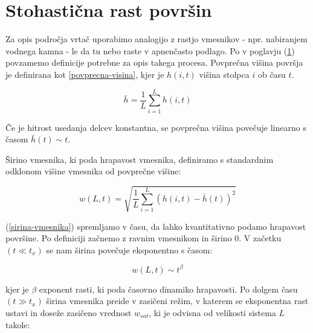 \documentclass[a4paper, oneside, 12pt]{book}
\begin{document}

        \section{Stohastična rast površin}
        \label{definicije}

        Za opis področja vrtač uporabimo analogijo z rastjo vmesnikov - npr. nabiranjem vodnega kamna - le da tu nebo raste v apnenčasto podlago.
        Po \cite{barabasi1995fractal} v poglavju (\ref{definicije}) povzamemo definicije potrebne za opis takega procesa.
        Povprečna višina površja je definirana kot \ref{povprecna-visina}, kjer je $h(i,t)$ višina stolpca $i$ ob času $t$.

        \begin{equation}
          \bar{h} = \frac{1}{L} \sum_{i=1}^L h(i,t)
          \label{povprecna-visina}
        \end{equation}

        Če je hitrost usedanja delcev konstantna, se povprečna višina povečuje linearno s časom $\bar{h}(t) \sim t$.

        Širino vmesnika, ki poda hrapavost vmesnika, definiramo s standardnim odklonom višine vmesnika od povprečne višine:

        \begin{equation}
          w(L,t) = \sqrt{\frac{1}{L} \sum_{i=1}^L (h(i,t)-\bar{h}(t))^2}
          \label{sirina-vmesnika}
        \end{equation}

        (\ref{sirina-vmesnika}) spremljamo v času, da lahko kvantitativno podamo hrapavost površine. Po definiciji začnemo z ravnim vmesnikom in širino 0. V začetku $(t \ll t_x)$ se nam širina povečuje eksponentno s časom:

        \begin{equation}
          w(L,t) \sim t^\beta
          \label{beta}
        \end{equation}

        kjer je $\beta$ exponent rasti, ki poda časovno dinamiko hrapavosti.
        Po dolgem času $(t \gg t_x)$ širina vmesnika preide v zasičeni režim, v katerem se eksponentna rast ustavi in doseže zasičeno vrednost $w_{sat}$, ki je odvisna od velikosti sistema $L$ takole:
\end{document}
